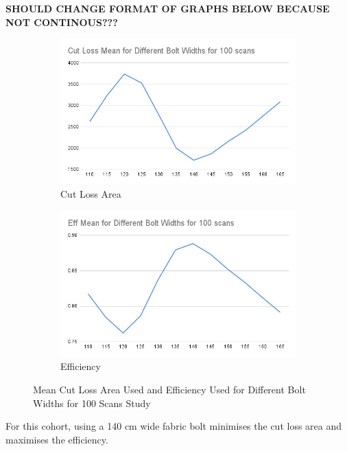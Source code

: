 \textbf{SHOULD CHANGE FORMAT OF GRAPHS BELOW BECAUSE NOT CONTINOUS???}
\begin{figure}[H]
    \centering
    \begin{subfigure}[b]{0.45\textwidth}
        \centering
        \includegraphics[width=\textwidth]{Images/Cut Loss Mean for Different Bolt Widths for 100 scans.png}
        \caption{Cut Loss Area}
    \end{subfigure}
    \hfill
    \begin{subfigure}[b]{0.45\textwidth}
        \centering
        \includegraphics[width=\textwidth]{Images/Eff Mean for Different Bolt Widths for 100 scans.png}
        \caption{Efficiency}
    \end{subfigure}
    \caption{Mean Cut Loss Area Used and Efficiency Used for Different Bolt Widths for 100 Scans Study}
\end{figure}

For this cohort, using a 140 cm wide fabric bolt minimises the cut loss area and maximises the efficiency.

